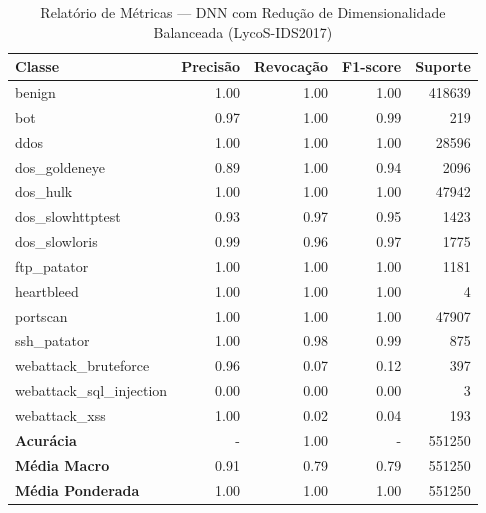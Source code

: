 \begin{table}[H]
    \centering
    \small
    \begin{tabular}{lrrrr}
        \hline
        Classe                    & Precisão & Revocação & F1-score & Suporte \\
        \hline
        benign                    & 1.00     & 1.00      & 1.00     & 418639  \\
        bot                       & 0.97     & 1.00      & 0.99     & 219     \\
        ddos                      & 1.00     & 1.00      & 1.00     & 28596   \\
        dos\_goldeneye            & 0.89     & 1.00      & 0.94     & 2096    \\
        dos\_hulk                 & 1.00     & 1.00      & 1.00     & 47942   \\
        dos\_slowhttptest         & 0.93     & 0.97      & 0.95     & 1423    \\
        dos\_slowloris            & 0.99     & 0.96      & 0.97     & 1775    \\
        ftp\_patator              & 1.00     & 1.00      & 1.00     & 1181    \\
        heartbleed                & 1.00     & 1.00      & 1.00     & 4       \\
        portscan                  & 1.00     & 1.00      & 1.00     & 47907   \\
        ssh\_patator              & 1.00     & 0.98      & 0.99     & 875     \\
        webattack\_bruteforce     & 0.96     & 0.07      & 0.12     & 397     \\
        webattack\_sql\_injection & 0.00     & 0.00      & 0.00     & 3       \\
        webattack\_xss            & 1.00     & 0.02      & 0.04     & 193     \\
        \hline
        \textbf{Acurácia}         & -        & 1.00      & -        & 551250  \\
        \textbf{Média Macro}      & 0.91     & 0.79      & 0.79     & 551250  \\
        \textbf{Média Ponderada}  & 1.00     & 1.00      & 1.00     & 551250  \\
        \hline
    \end{tabular}
    \caption{Relatório de Métricas — DNN com Redução de Dimensionalidade Balanceada (LycoS-IDS2017)}
    \label{table:dnn_lycos_reducao_balanced_metricas}
\end{table}
